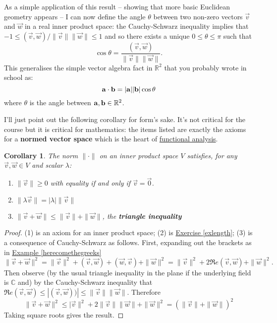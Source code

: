 \documentclass[11pt]{amsbook}
\newtheorem{corollary}[theorem]{Corollary}
\theoremstyle{definition}
\begin{document}
As a simple application of this result -- showing that more basic Euclidean geometry appears -- I can now define the angle $\theta$ between two non-zero vectors $\vec{v}$ and $\vec{w}$ in a real inner product space: the Cauchy-Schwarz inequality implies that $-1 \leqslant (\vec{v}, \vec{w}) /\|\vec{v}\| \|\vec{w}\| \leqslant 1$ and so there exists a unique $0\leqslant \theta \leqslant \pi$ such that $$\cos \theta = \frac{(\vec{v}, \vec{w}) }{\|\vec{v}\| \|\vec{w}\|}.$$ This generalises the simple vector algebra fact in $\mathbb{R}^2$ that you probably wrote in school as:
$${\bf a}\cdot {\bf b} = |{\bf a}| |{\bf b}| \cos \theta$$
where $\theta$ is the angle between ${\bf a}, {\bf b}\in \mathbb{R}^2$.

I'll just point out the following corollary for form's sake. It's not critical for the course but it is critical for mathematics: the items listed are exactly the axioms for a {\bf normed vector space} which is the heart of \href{http://www.drps.ed.ac.uk/14-15/dpt/cxmath11097.htm}{functional analysis}.
\begin{corollary} \label{normcor}
The norm $\| \cdot \|$ on an inner product space $V$ satisfies, for any $\vec{v}, \vec{w}\in V$ and scalar $\lambda$:
\begin{enumerate}
\item $\| \vec{v} \| \geqslant 0$ with equality if and only if $\vec{v} = \vec{0}$.
\item $\| \lambda \vec{v} \| = |\lambda | \| \vec{v} \|$
\item $\| \vec{v}  + \vec{w} \| \leqslant \| \vec{v} \| + \| \vec{w} \|$, the {\bf triangle inequality}
\end{enumerate}
\end{corollary}
\begin{proof}
(1) is an axiom for an inner product space; (2) is \hyperref[exlength]{Exercise \ref{exlength}}; (3) is a consequence of Cauchy-Schwarz as follows. First, expanding out the brackets as in \hyperref[herecomethegreeks]{Example \ref{herecomethegreeks}} $$\| \vec{v} + \vec{w}\|^2 = \|\vec{v}\|^2 + (\vec{v}, \vec{w}) + (\vec{w}, \vec{v}) + \| \vec{w}\|^2 =  \|\vec{v}\|^2 + 2 \mathfrak{R}e(\vec{v}, \vec{w}) + \| \vec{w}\|^2.$$ Then observe (by the usual triangle inequality in the plane if the underlying field is $\mathbb{C}$ and) by the Cauchy-Schwarz inequality that $\mathfrak{R}e(\vec{v}, \vec{w}) \leqslant | (\vec{v}, \vec{w})) | \leqslant \|\vec{v}\| \| \vec{w}\|$. Therefore $$\| \vec{v} + \vec{w}\|^2 \leqslant  |\vec{v}\|^2 + 2\|\vec{v}\| \| \vec{w}\| + \| \vec{w}\|^2 = ( \|\vec{v}\| + \|\vec{w}\|)^2$$ Taking square roots gives the result.
\end{proof}
\end{document}
